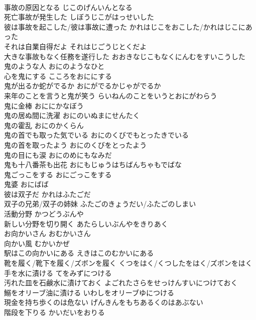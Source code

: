 \documentclass[8pt]{extreport}
\begin{document}
\begin{CJK}{UTF8}{min}
\\	事故の原因となる	じこのげんいんとなる	
\\	死亡事故が発生した	しぼうじこがはっせいした	
\\	彼は事故を起こした/彼は事故に遭った	かれはじこをおこした/かれはじこにあった	
\\	それは自業自得だよ	それはじごうじとくだよ	
\\	大きな事故もなく任務を遂行した	おおきなじこもなくにんむをすいこうした	
\\	鬼のような人	おにのようなひと	
\\	心を鬼にする	こころをおににする	
\\	鬼が出るか蛇がでるか	おにがでるかじゃがでるか	
\\	来年のことを言うと鬼が笑う	らいねんのことをいうとおにがわらう	
\\	鬼に金棒	おににかなぼう	
\\	鬼の居ぬ間に洗濯	おにのいぬまにせんたく	
\\	鬼の霍乱	おにのかくらん	
\\	鬼の首でも取った気でいる	おにのくびでもとったきでいる	
\\	鬼の首を取ったよう	おにのくびをとったよう	
\\	鬼の目にも涙	おにのめにもなみだ	
\\	鬼も十八番茶も出花	おにもじゅうはちばんちゃもでばな	
\\	鬼ごっこをする	おにごっこをする	
\\	鬼婆	おにばば	
\\	彼は双子だ	かれはふたごだ	
\\	双子の兄弟/双子の姉妹	ふたごのきょうだい/ふたごのしまい	
\\	活動分野	かつどうぶんや	
\\	新しい分野を切り開く	あたらしいぶんやをきりあく	
\\	お向かいさん	おむかいさん	
\\	向かい風	むかいかぜ	
\\	駅はこの向かいにある	えきはこのむかいにある	
\\	靴を履く/靴下を履く/ズボンを履く	くつをはく/くつしたをはく/ズボンをはく	
\\	手を水に漬ける	てをみずにつける	
\\	汚れた皿を石鹸水に漬けておく	よごれたさらをせっけんすいにつけておく	
\\	鰯をオリーブ油に漬ける	いわしをオリーブゆにつける	
\\	現金を持ち歩くのは危ない	げんきんをもちあるくのはあぶない	
\\	階段を下りる	かいだいをおりる	

\end{CJK}
\end{document}
